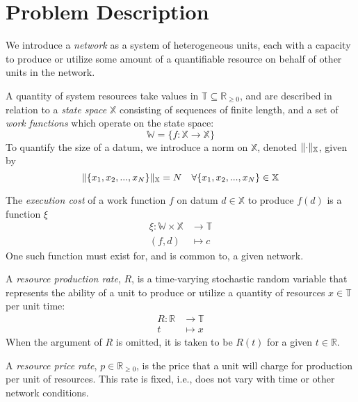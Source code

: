 \documentclass[../mthe-493-project-proposal.tex]{subfiles}
\begin{document}
    \chapter{Problem Description}
    \label{ch:problem-description}
    We introduce a \textit{network} as a system of heterogeneous units, each with a capacity to produce or utilize some amount of a quantifiable resource on behalf of other units in the network.

    A quantity of system resources take values in $\mathbb{T} \subseteq \mathbb{R}_{\geq 0}$, and are described in relation to a \textit{state space} $\mathbb{X}$ consisting of sequences of finite length, and a set of \textit{work functions} which operate on the state space:
    \begin{equation*}
        \mathbb{W} = \{f: \mathbb{X} \rightarrow \mathbb{X}\}
    \end{equation*}
    To quantify the size of a datum, we introduce a norm on $\mathbb{X}$, denoted $\lVert\cdot\rVert_{\mathbb{X}}$, given by
    \begin{equation*}
        \lVert\{x_1, x_2, ..., x_N\}\rVert_{\mathbb{X}} = N \quad \forall \{x_1, x_2, ..., x_N\} \in \mathbb{X}
    \end{equation*}
    
    The \textit{execution cost} of a work function $f$ on datum $d \in \mathbb{X}$ to produce $f(d)$ is a function $\xi$
    \begin{align*}
        \xi \colon \mathbb{W} \times \mathbb{X} &\to \mathbb{T} \\
        (f, d)                                    &\mapsto c
    \end{align*}
    One such function must exist for, and is common to, a given network.
    
    A \textit{resource production rate}, $R$, is a time-varying stochastic random variable that represents the ability of a unit to produce or utilize a quantity of resources $x \in \mathbb{T}$ per unit time:
    \begin{align*}
        R \colon \mathbb{R} &\to \mathbb{T} \\
        t                   &\mapsto x
    \end{align*}
    When the argument of $R$ is omitted, it is taken to be $R(t)$ for a given $t \in \mathbb{R}$.

    A \textit{resource price rate}, $p \in \mathbb{R}_{\geq 0}$, is the price that a unit will charge for production per unit of resources. This rate is fixed, i.e., does not vary with time or other network conditions.
\end{document}
